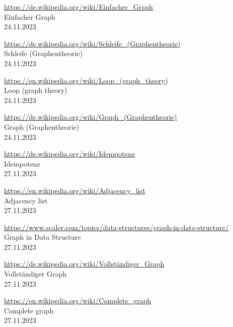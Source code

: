 \begin{thebibliography}{999}
    \href{https://de.wikipedia.org/wiki/Einfacher_Graph}{https://de.wikipedia.org/wiki/Einfacher\_Graph}\\
    Einfacher Graph\\
    24.11.2023

    \href{https://de.wikipedia.org/wiki/Schleife_(Graphentheorie)}{https://de.wikipedia.org/wiki/Schleife\_(Graphentheorie)}\\
    Schleife (Graphentheorie)\\
    24.11.2023

    \href{https://en.wikipedia.org/wiki/Loop_(graph_theory)}{https://en.wikipedia.org/wiki/Loop\_(graph\_theory)}\\
    Loop (graph theory)\\
    24.11.2023

    \href{https://de.wikipedia.org/wiki/Graph_(Graphentheorie)}{https://de.wikipedia.org/wiki/Graph\_(Graphentheorie)}\\
    Graph (Graphentheorie)\\
    24.11.2023

    \href{https://de.wikipedia.org/wiki/Idempotenz}{https://de.wikipedia.org/wiki/Idempotenz}\\
    Idempotenz\\
    27.11.2023

    \href{https://en.wikipedia.org/wiki/Adjacency_list}{https://en.wikipedia.org/wiki/Adjacency\_list}\\
    Adjacency list\\
    27.11.2023

    \href{https://www.scaler.com/topics/data-structures/graph-in-data-structure/}{https://www.scaler.com/topics/data-structures/graph-in-data-structure/}\\
    Graph in Data Structure\\
    27.11.2023

    \href{https://de.wikipedia.org/wiki/Vollständiger_Graph}{https://de.wikipedia.org/wiki/Vollständiger\_Graph}\\
    Vollständiger Graph\\
    27.11.2023

    \href{https://en.wikipedia.org/wiki/Complete_graph}{https://en.wikipedia.org/wiki/Complete\_graph}\\
    Complete graph\\
    27.11.2023


\end{thebibliography}

